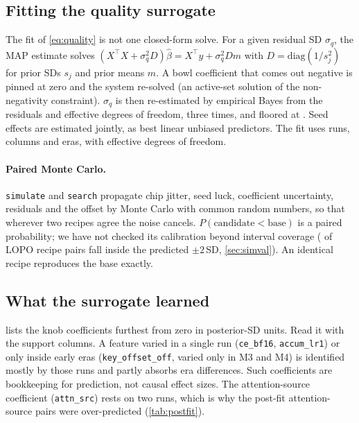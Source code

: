 \subsection{Fitting the quality surrogate}
\label{app:fit}

The fit of \cref{eq:quality} is not one closed-form solve. For a given residual SD $\sigma_q$, the MAP estimate solves
$(X^\top X + \sigma_q^2 D)\hat\beta = X^\top y + \sigma_q^2 D m$ with $D=\mathrm{diag}(1/s_j^2)$ for prior SDs $s_j$
and prior means $m$. A bowl coefficient that comes out negative is pinned at zero and the system re-solved (an
active-set solution of the non-negativity constraint). $\sigma_q$ is then re-estimated by empirical Bayes from the
residuals and effective degrees of freedom, three times, and floored at . Seed effects are
estimated jointly, as best linear unbiased predictors. The fit uses  runs,  columns and
 eras, with  effective degrees of freedom.

\paragraph{Paired Monte Carlo.} \texttt{simulate} and \texttt{search} propagate chip jitter, seed luck, coefficient
uncertainty, residuals and the offset by Monte Carlo with common random numbers, so that wherever two recipes agree
the noise cancels. $P(\text{candidate} < \text{base})$ is a paired probability; we have not checked its calibration
beyond interval coverage ( of LOPO recipe pairs fall inside the predicted $\pm2$\,SD,
\cref{sec:simval}). An identical recipe reproduces the base exactly.

\subsection{What the surrogate learned}

 lists the knob coefficients furthest from zero in posterior-SD units. Read it with the
support columns. A feature varied in a single run (\texttt{ce\_bf16}, \texttt{accum\_lr1}) or only inside early eras
(\texttt{key\_offset\_off}, varied only in M3 and M4) is identified mostly by those runs and partly absorbs era
differences. Such coefficients are bookkeeping for prediction, not causal effect sizes. The attention-source
coefficient (\texttt{attn\_src}) rests on two runs, which is why the post-fit attention-source pairs were
over-predicted (\cref{tab:postfit}).

